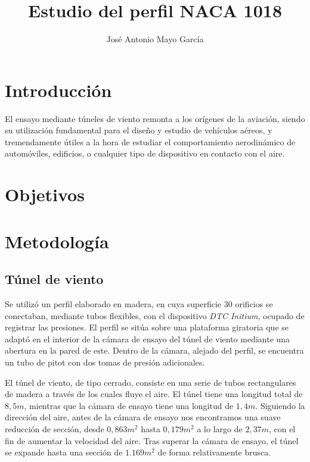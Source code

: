 \documentclass{article}
\title{Estudio del perfil NACA 1018}
\author{José Antonio Mayo García}
\begin{document}
\maketitle

\tableofcontents

\section{Introducción}

El ensayo mediante túneles de viento remonta a los orígenes de la aviación, siendo su utilización fundamental para el diseño
y estudio de vehículos aéreos, y tremendamente útiles a la hora de estudiar el comportamiento aerodinámico de automóviles,
edificios, o cualquier tipo de dispositivo en contacto con el aire. \cite{Barlow1999-wm}

\section{Objetivos}

\section{Metodología}

\subsection{Túnel de viento}

Se utilizó un perfil elaborado en madera, en cuya superficie 30 orificios se conectaban, mediante tubos flexibles, 
con el dispositivo \textit{DTC Initium}, ocupado de registrar las presiones. El perfil se sitúa sobre una plataforma giratoria que se 
adaptó en el interior de la cámara de ensayo del túnel de viento mediante una abertura en la pared de este. Dentro de la cámara,
alejado del perfil, se encuentra un tubo de pitot con dos tomas de presión adicionales.

El túnel de viento, de tipo cerrado, consiste en una serie de tubos rectangulares de madera a través de los cuales fluye el aire.
El túnel tiene una longitud total de $8,5m$, mientras que la cámara de ensayo tiene una longitud de $1,4m$. Siguiendo la dirección
del aire, antes de la cámara de ensayo nos encontramos una suave reducción de sección, desde $0,863m^2$ hasta $0,179m^2$ 
a lo largo de $2,37m$, con el fin de aumentar la velocidad del aire. Tras superar la cámara de ensayo, el túnel se expande
hasta una sección de $1.169m^2$ de forma relativamente brusca. 
\end{document}
